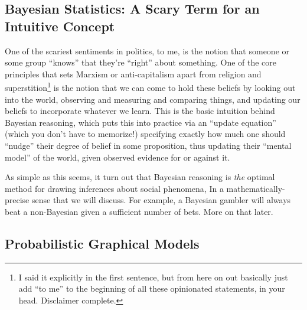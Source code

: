 \subsection{Bayesian Statistics: A Scary Term for an Intuitive Concept}

One of the scariest sentiments in politics, to me, is the notion that someone or some group ``knows'' that they're ``right'' about something. One of the core principles that sets Marxism or anti-capitalism apart from religion and superstition\footnote{I said it explicitly in the first sentence, but from here on out basically just add ``to me'' to the beginning of all these opinionated statements, in your head. Disclaimer complete.} is the notion that we can come to hold these beliefs by looking out into the world, observing and measuring and comparing things, and updating our beliefs to incorporate whatever we learn. This is the basic intuition behind Bayesian reasoning, which puts this into practice via an ``update equation'' (which you don't have to memorize!) specifying exactly how much one should ``nudge'' their degree of belief in some proposition, thus updating their ``mental model'' of the world, given observed evidence for or against it.

As simple as this seems, it turn out that Bayesian reasoning is \textit{the} optimal method for drawing inferences about social phenomena, In a mathematically-precise sense that we will discuss. For example, a Bayesian gambler will always beat a non-Bayesian given a sufficient number of bets. More on that later.

\subsection{Probabilistic Graphical Models}

